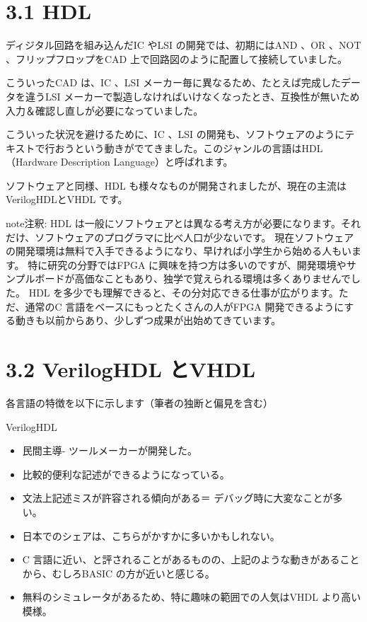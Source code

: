 \documentclass[letterpaper,10pt,dvipdfmx]{sphinxmanual}
\begin{document}
\section{3.1 HDL}
\label{03_fpga:hdl}
ディジタル回路を組み込んだIC やLSI の開発では、初期にはAND 、OR 、NOT 、フリップフロップをCAD 上で回路図のように配置して接続していました。

こういったCAD は、IC 、LSI メーカー毎に異なるため、たとえば完成したデータを違うLSI メーカーで製造しなければいけなくなったとき、互換性が無いため入力＆確認し直しが必要になっていました。

こういった状況を避けるために、IC 、LSI の開発も、ソフトウェアのようにテキストで行おうという動きがでてきました。このジャンルの言語はHDL （Hardware Description Language）と呼ばれます。

ソフトウェアと同様、HDL も様々なものが開発されましたが、現在の主流はVerilogHDLとVHDL です。

\begin{notice}{note}{注釈:}
HDL は一般にソフトウェアとは異なる考え方が必要になります。それだけ、ソフトウェアのプログラマに比べ人口が少ないです。
現在ソフトウェアの開発環境は無料で入手できるようになり、早ければ小学生から始める人もいます。
特に研究の分野ではFPGA に興味を持つ方は多いのですが、開発環境やサンプルボードが高価なこともあり、独学で覚えられる環境は多くありませんでした。
HDL を多少でも理解できると、その分対応できる仕事が広がります。ただ、通常のC 言語をベースにもっとたくさんの人がFPGA 開発できるようにする動きも以前からあり、少しずつ成果が出始めてきています。
\end{notice}


\section{3.2 VerilogHDL とVHDL}
\label{03_fpga:veriloghdl-vhdl}
各言語の特徴を以下に示します（筆者の独断と偏見を含む）

VerilogHDL
\begin{itemize}
\item {} 
民間主導- ツールメーカーが開発した。

\item {} 
比較的便利な記述ができるようになっている。

\item {} 
文法上記述ミスが許容される傾向がある＝ デバッグ時に大変なことが多い。

\item {} 
日本でのシェアは、こちらがかすかに多いかもしれない。

\item {} 
C 言語に近い、と評されることがあるものの、上記のような動きがあることから、むしろBASIC の方が近いと感じる。

\item {} 
無料のシミュレータがあるため、特に趣味の範囲での人気はVHDL より高い模様。

\end{itemize}
\end{document}
